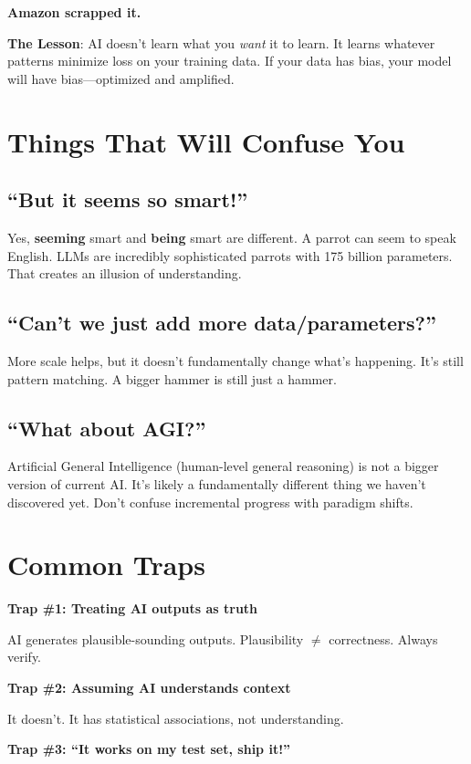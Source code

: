 \textbf{Amazon scrapped it.}

\textbf{The Lesson}: AI doesn't learn what you \textit{want} it to learn. It learns whatever patterns minimize loss on your training data. If your data has bias, your model will have bias---optimized and amplified.

\section{Things That Will Confuse You}

\subsection{``But it seems so smart!''}
Yes, \textbf{seeming} smart and \textbf{being} smart are different. A parrot can seem to speak English. LLMs are incredibly sophisticated parrots with 175 billion parameters. That creates an illusion of understanding.

\subsection{``Can't we just add more data/parameters?''}
More scale helps, but it doesn't fundamentally change what's happening. It's still pattern matching. A bigger hammer is still just a hammer.

\subsection{``What about AGI?''}
Artificial General Intelligence (human-level general reasoning) is not a bigger version of current AI. It's likely a fundamentally different thing we haven't discovered yet. Don't confuse incremental progress with paradigm shifts.

\section{Common Traps}

\textbf{Trap \#1: Treating AI outputs as truth}

AI generates plausible-sounding outputs. Plausibility \(\neq\) correctness. Always verify.

\textbf{Trap \#2: Assuming AI understands context}

It doesn't. It has statistical associations, not understanding.

\textbf{Trap \#3: ``It works on my test set, ship it!''}

